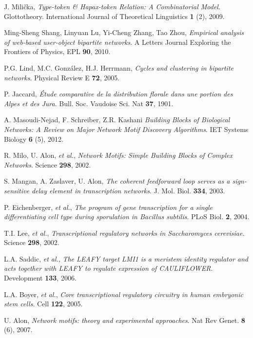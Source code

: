 \begin{thebibliography}{99}
  J. Milička,
  \emph{Type-token \& Hapax-token Relation: A Combinatorial Model}.
  Glottotheory. International Journal of Theoretical Linguistics \textbf{1} (2),
  2009.

  Ming-Sheng Shang, Linyuan Lu, Yi-Cheng Zhang, Tao Zhou,
  \emph{Empirical analysis of web-based user-object bipartite networks}.
  A Letters Journal Exploring the Frontiers of Physics, EPL \textbf{90},
  2010.

  P.G. Lind, M.C. González, H.J. Herrmann,
  \emph{Cycles and clustering in bipartite networks}.
  Physical Review E \textbf{72},
  2005.

  P. Jaccard,
  \emph{Étude comparative de la distribution florale dans une portion des Alpes et des Jura}.
  Bull. Soc. Vaudoise Sci. Nat \textbf{37},
  1901.

  A. Masoudi-Nejad, F. Schreiber, Z.R. Kashani
  \emph{Building Blocks of Biological Networks: A Review on Major Network Motif Discovery Algorithms}.
  IET Systems Biology \textbf{6} (5),  
  2012.

  R. Milo, U. Alon, \emph{et al.},
  \emph{Network Motifs: Simple Building Blocks of Complex Networks}.
  Science \textbf{298},
  2002.

  S. Mangan, A. Zaslaver, U. Alon,
  \emph{The coherent feedforward loop serves as a sign-sensitive delay element in transcription networks}.
  J. Mol. Biol. \textbf{334},
  2003.

  P. Eichenberger, \emph{et al.},
  \emph{The program of gene  transcription for a single differentiating cell type during sporulation in Bacillus subtilis}.
  PLoS Biol. \textbf{2},
  2004.

  T.I. Lee, \emph{et al.},
  \emph{Transcriptional regulatory networks in Saccharomyces cerevisiae.}
  Science \textbf{298},
  2002.

  L.A. Saddic, \emph{et al.},
  \emph{The LEAFY target LMI1 is a meristem identity regulator and acts together with LEAFY to regulate expression of CAULIFLOWER}.
  Development \textbf{133},
  2006.

  L.A. Boyer, \emph{et al.},
  \emph{Core transcriptional regulatory circuitry in human embryonic stem cells}.
  Cell \textbf{122},
  2005.

  U. Alon,
  \emph{Network motifs: theory and experimental approaches}.
  Nat Rev Genet. \textbf{8} (6),
  2007.

\end{thebibliography}

